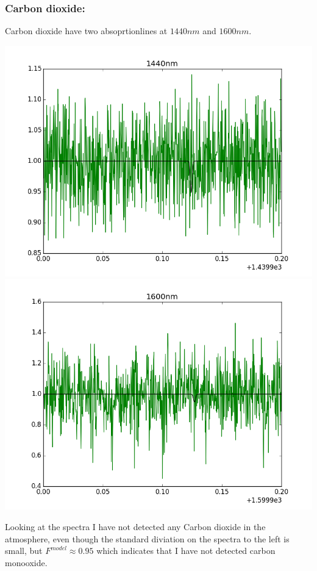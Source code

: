\documentclass[a4paper,11pt,english]{report}
\begin{document}
\subsubsection{Carbon dioxide:} Carbon dioxide have two absoprtionlines at
\(1440nm\) and \(1600nm\).
\begin{center}
  \includegraphics[scale =0.32]{1440nm.png}
  \endminipage\hfill
  \includegraphics[scale = 0.32]{1600nm.png}
  \endminipage
\end{center}


Looking at the spectra I have not detected any Carbon dioxide in the
atmosphere, even though the standard diviation on the spectra to the left is
small, but \(F^{model} \approx 0.95\) which indicates that I have not detected
carbon monooxide.
\end{document}
